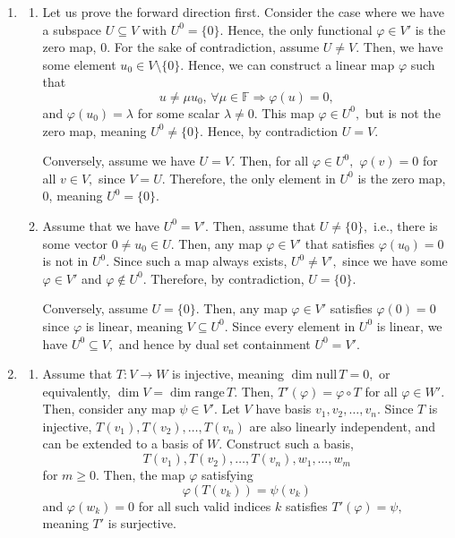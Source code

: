 \documentclass[12pt]{article}
\begin{document}
\begin{enumerate}
  \item
    \begin{enumerate}
      \item Let us prove the forward direction first. Consider the
        case where we have a subspace $U \subseteq V$ with $U^{0} =
        \{0\}.$ Hence, the only functional $\varphi \in V'$ is the
        zero map, $0.$ For the sake of contradiction, assume $U \neq
        V.$ Then, we have some element $u_0 \in V \setminus \{0\}.$
        Hence, we can construct a linear map $\varphi$ such that
        $$
        u \neq \mu u_0,\,  \forall \mu \in \mathbb F \Rightarrow
        \varphi(u) = 0,
        $$
        and $\varphi(u_0) = \lambda$ for some scalar $\lambda \neq
        0.$ This map $\varphi \in U^{0},$ but is not the zero map,
        meaning $U^{0} \neq \{0\}.$ Hence, by contradiction $U = V.$

        Conversely, assume we have $U = V.$ Then, for all $\varphi
        \in U^{0},$  $\varphi(v) = 0$ for all $v \in V,$ since $V =
        U.$ Therefore, the only element in $U^{0}$ is the zero map,
        $0$, meaning $U^{0} = \{0\}.$

      \item Assume that we have $U^{0} = V'.$ Then, assume that $U
        \neq \{0\},$ i.e., there is some vector $0\neq u_0 \in U.$
        Then, any map $\varphi \in V'$ that satisfies $\varphi(u_0) =
        0$ is not in $U^{0}.$ Since such a map always exists, $U^{0}
        \neq V',$ since we have some $\varphi \in V'$ and $\varphi
        \not \in U^{0}.$ Therefore, by contradiction, $U = \{0\}.$

        Conversely, assume $U = \{0\}.$ Then, any map $\varphi \in
        V'$ satisfies $\varphi(0)= 0$ since $\varphi$ is linear,
        meaning $V \subseteq U^{0}.$ Since every element in $U^{0}$
        is linear, we have $U^{0} \subseteq V,$ and hence by dual set
        containment $U^{0} = V'.$
    \end{enumerate}

  \item
    \begin{enumerate}
      \item Assume that $T: V \to W$ is injective, meaning $\dim
        \text{null}\, T = 0,$ or equivalently, $\dim V = \dim
        \text{range}\, T.$ Then, $T'(\varphi) = \varphi \circ T$ for
        all $\varphi \in W'.$ Then, consider any map $\psi \in V'$.
        Let $V$ have basis $v_1, v_2, \ldots, v_n.$ Since $T$ is
        injective, $T(v_1), T(v_2), \ldots, T(v_n)$ are also linearly
        independent, and can be extended to a basis of $W.$ Construct
        such a basis,
        $$
        T(v_1), T(v_2), \ldots,T(v_n), w_1, \ldots, w_m
        $$
        for $m \geq 0.$ Then, the map $\varphi$ satisfying
        $$
        \varphi(T(v_k)) = \psi (v_k)
        $$
        and $\varphi(w_k) = 0$ for all such valid indices $k$
        satisfies $T'(\varphi) = \psi,$ meaning $T'$ is surjective.


\end{enumerate}
\end{enumerate}
\end{document}
